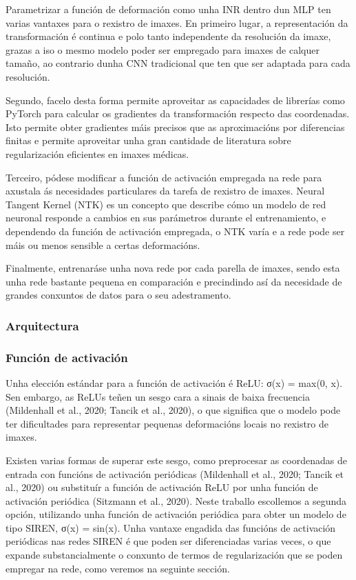 Parametrizar a función de deformación como unha INR dentro dun MLP ten varias vantaxes para o rexistro de imaxes.
En primeiro lugar, a representación da transformación é continua e polo tanto independente da resolución da imaxe, 
grazas a iso o mesmo modelo poder ser empregado para imaxes de calquer tamaño, ao contrario dunha CNN tradicional 
que ten que ser adaptada para cada resolución.

Segundo, facelo desta forma permite aproveitar as capacidades de librerías como PyTorch para calcular os gradientes da transformación respecto das coordenadas.
Isto permite obter gradientes máis precisos que as aproximacións por diferencias finitas 
e permite aproveitar unha gran cantidade de literatura sobre regularización eficientes en imaxes médicas.

Terceiro, pódese modificar a función de activación empregada na rede para axustala ás necesidades particulares da tarefa de rexistro de imaxes.
Neural Tangent Kernel (NTK) es un concepto que describe cómo un modelo de red neuronal responde a cambios en sus parámetros durante el entrenamiento,
 e dependendo da función de activación empregada, o NTK varía e a rede pode ser máis ou menos sensible a certas deformacións.

 Finalmente, entrenaráse unha nova rede por cada parella de imaxes, sendo esta unha rede bastante pequena en comparación e precindindo así da necesidade de grandes conxuntos de datos para o seu adestramento.
 
\subsubsection{Arquitectura}
\label{subsubsec:Arquitectura}


\subsubsection{Función de activación}
\label{subsubsec:Función de activación}

Unha elección estándar para a función de activación é ReLU: σ(x) = max(0, x).
Sen embargo, as ReLUs teñen un sesgo cara a sinais de baixa frecuencia (Mildenhall et al., 2020; Tancik et al., 2020), 
 o que significa que o modelo pode ter dificultades para representar pequenas deformacións locais no rexistro de imaxes.
 
Existen varias formas de superar este sesgo, como preprocesar as coordenadas de entrada con funcións de activación periódicas (Mildenhall et al., 2020; Tancik et al., 2020) ou substituír a función de activación ReLU por unha función de activación periódica (Sitzmann et al., 2020).
Neste traballo escollemos a segunda opción, utilizando unha función de activación periódica para obter un modelo de tipo SIREN, σ(x) = sin(x).
Unha vantaxe engadida das funcións de activación periódicas nas redes SIREN é que poden ser diferenciadas varias veces, 
o que expande substancialmente o conxunto de termos de regularización que se poden empregar na rede, como veremos na seguinte sección.


